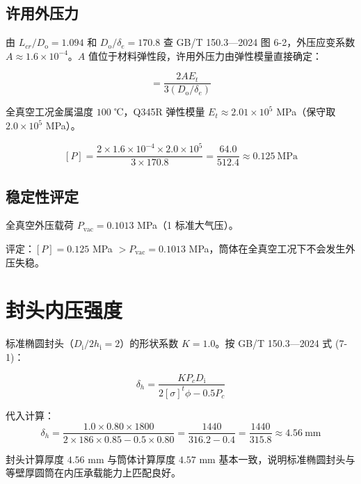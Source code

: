 \subsection{许用外压力}

由 $L_{cr}/D_{\mathrm{o}} = 1.094$ 和 $D_{\mathrm{o}}/\delta_e = 170.8$ 查 GB/T 150.3—2024 图 6-2，外压应变系数 $A \approx 1.6 \times 10^{-4}$。$A$ 值位于材料弹性段，许用外压力由弹性模量直接确定：

\begin{equation}
[P] = \frac{2AE_t}{3(D_{\mathrm{o}}/\delta_e)}
\label{eq:allow-p}
\end{equation}

全真空工况金属温度 $100$ ℃，Q345R 弹性模量 $E_t \approx 2.01 \times 10^5$ MPa（保守取 $2.0 \times 10^5$ MPa）。

\[
[P] = \frac{2 \times 1.6 \times 10^{-4} \times 2.0 \times 10^5}{3 \times 170.8}
     = \frac{64.0}{512.4}
     \approx 0.125\ \text{MPa}
\]

\subsection{稳定性评定}

全真空外压载荷 $P_{\text{vac}} = 0.1013$ MPa（1 标准大气压）。

评定：$[P] = 0.125$ MPa $ > P_{\text{vac}} = 0.1013$ MPa，筒体在全真空工况下不会发生外压失稳。

\section{封头内压强度}

标准椭圆封头（$D_{\mathrm{i}}/2h_{\mathrm{i}} = 2$）的形状系数 $K = 1.0$。按 GB/T 150.3—2024 式 (7-1)：

\begin{equation}
\delta_h = \frac{K P_c D_{\mathrm{i}}}{2[\sigma]^t \phi - 0.5P_c}
\label{eq:head-delta}
\end{equation}

代入计算：
\begin{equation}
\delta_h = \frac{1.0 \times 0.80 \times 1800}{2 \times 186 \times 0.85 - 0.5 \times 0.80}
         = \frac{1440}{316.2 - 0.4}
         = \frac{1440}{315.8}
         \approx 4.56\ \text{mm}
\label{eq:head-delta-result}
\end{equation}

封头计算厚度 $4.56$ mm 与筒体计算厚度 $4.57$ mm 基本一致，说明标准椭圆封头与等壁厚圆筒在内压承载能力上匹配良好。

